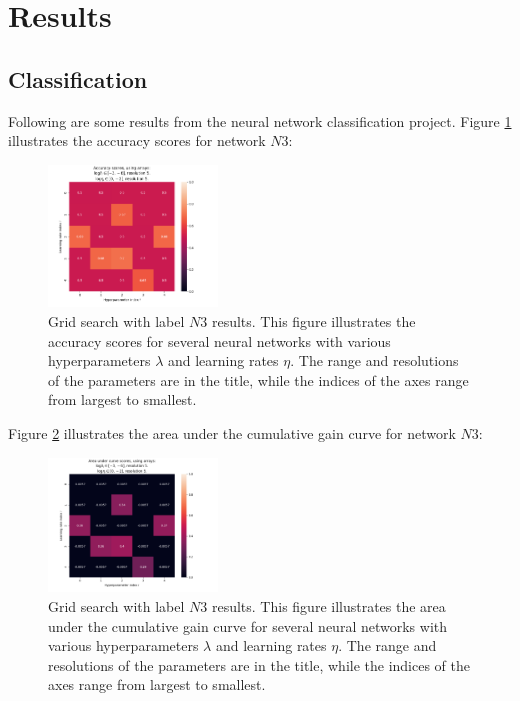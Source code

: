 \section{Results}
    \subsection{Classification}
        
        Following are some results from the neural network classification project. Figure \ref{fig:ANNREG1} illustrates the accuracy scores for network $N3$:
        \begin{figure}[H]
            \centering
            \includegraphics[width=0.4\textwidth]{figures/Ngrid3_acc.png}
            \caption{Grid search with label $N3$ results. This figure illustrates the accuracy scores for several neural networks with various hyperparameters $\lambda$ and learning rates $\eta$. The range and resolutions of the parameters are in the title, while the indices of the axes range from largest to smallest.}
            \label{fig:ANNREG1}
        \end{figure}
        Figure \ref{fig:ANNREG2} illustrates the area under the cumulative gain curve for network $N3$:
        \begin{figure}[H]
            \centering
            \includegraphics[width=0.4\textwidth]{figures/Ngrid3_auc.png}
            \caption{Grid search with label $N3$ results. This figure illustrates the area under the cumulative gain curve for several neural networks with various hyperparameters $\lambda$ and learning rates $\eta$. The range and resolutions of the parameters are in the title, while the indices of the axes range from largest to smallest.}
            \label{fig:ANNREG2}
        \end{figure}
